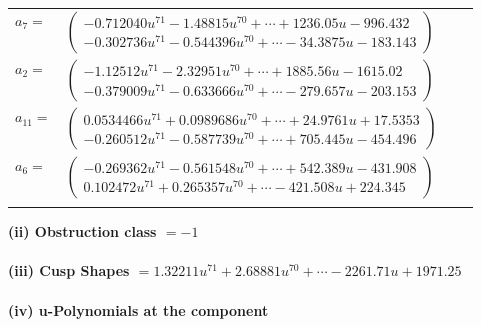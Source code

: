 \documentclass[1p]{elsarticle_modified}
\theoremstyle{definition}
\begin{document}
\begin{tabular}{m{7pt} m{180pt} m{7pt} m{180pt} }
\flushright $a_{7}=$&$\begin{pmatrix}-0.712040 u^{71}-1.48815 u^{70}+\cdots+1236.05 u-996.432\\-0.302736 u^{71}-0.544396 u^{70}+\cdots-34.3875 u-183.143\end{pmatrix}$ \\
\flushright $a_{2}=$&$\begin{pmatrix}-1.12512 u^{71}-2.32951 u^{70}+\cdots+1885.56 u-1615.02\\-0.379009 u^{71}-0.633666 u^{70}+\cdots-279.657 u-203.153\end{pmatrix}$ \\
\flushright $a_{11}=$&$\begin{pmatrix}0.0534466 u^{71}+0.0989686 u^{70}+\cdots+24.9761 u+17.5353\\-0.260512 u^{71}-0.587739 u^{70}+\cdots+705.445 u-454.496\end{pmatrix}$ \\
\flushright $a_{6}=$&$\begin{pmatrix}-0.269362 u^{71}-0.561548 u^{70}+\cdots+542.389 u-431.908\\0.102472 u^{71}+0.265357 u^{70}+\cdots-421.508 u+224.345\end{pmatrix}$\\&\end{tabular}
\flushleft \textbf{(ii) Obstruction class $= -1$}\\~\\
\flushleft \textbf{(iii) Cusp Shapes $= 1.32211 u^{71}+2.68881 u^{70}+\cdots-2261.71 u+1971.25$}\\~\\
\newpage\renewcommand{\arraystretch}{1}
\flushleft \textbf{(iv) u-Polynomials at the component}\newline \\
\end{document}
